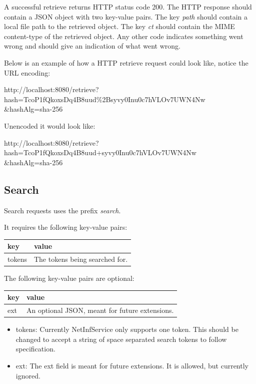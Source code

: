 A successful retrieve returns HTTP status code 200. The HTTP response should contain a JSON object with two key-value pairs. The key \emph{path} should contain a local file path to the retrieved object. The key \emph{ct} should contain the MIME content-type of the retrieved object. Any other code indicates something went wrong and should give an indication of what went wrong.

Below is an example of how a HTTP retrieve request could look like, notice the URL encoding:

http://localhost:8080/retrieve?hash=TcoP1fQkoxsDq4B8uud\%2Bsyvy0Inu0c7hVLOv7UWN4Nw \\ \&hashAlg=sha-256

Unencoded it would look like:

http://localhost:8080/retrieve?hash=TcoP1fQkoxsDq4B8uud+syvy0Inu0c7hVLOv7UWN4Nw \\ \&hashAlg=sha-256

\subsection{Search}

Search requests uses the prefix \emph{search}.

It requires the following key-value pairs:

\begin{tabular}{ | l | l | }
	\hline
	key & value  \\ \hline \hline
	tokens & The tokens being searched for.  \\ \hline
\end{tabular}

The following key-value pairs are optional:

\begin{tabular}{ | l | l | }
	\hline
	key & value  \\ \hline \hline
	ext & An optional JSON, meant for future extensions. \\ \hline
\end{tabular}

\begin{itemize}
	\item tokens: Currently NetInfService only supports one token. This should be changed to accept a string of space separated search tokens to follow specification.
	\item ext: The ext field is meant for future extensions. It is allowed, but currently ignored.
 \end{itemize}

